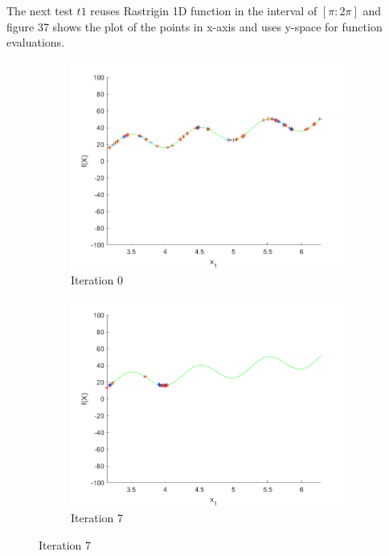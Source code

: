 \par The next test $t1$ reuses Rastrigin 1D function in the interval of $[\pi:2\pi]$ and figure 37 shows the plot of the points in x-axis and uses y-space for function evaluations.

\begin{figure}
  \centering
 \begin{subfigure}[b]{0.4\textwidth}
   \includegraphics[width=\textwidth]{img/smpl/rast1dshft/loa-iter-0}
   \caption{Iteration 0}
   \label{fig:i1-iter-0}
 \end{subfigure}
 \begin{subfigure}[b]{0.4\textwidth}
   \includegraphics[width=\textwidth]{img/smpl/rast1dshft/loa-iter-7}
   \caption{Iteration 7}

\end{subfigure}
\end{figure}
